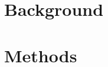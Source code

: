\documentclass[12pt]{article}
\begin{document}




\section{Background}







\section{Methods}
\end{document}
